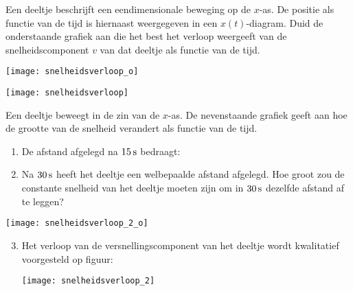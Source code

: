 \documentclass{ximera}
\begin{document}
\begin{exercise}
    Een deeltje beschrijft een eendimensionale beweging op de $x$-as. De positie als functie van de tijd is hiernaast weergegeven in een $x(t)$-diagram. Duid de onderstaande grafiek aan die het best het verloop weergeeft van de snelheidscomponent $v$ van dat deeltje als functie van de tijd. 
    \begin{image}
        \texttt{[image: snelheidsverloop\_o]}
    \end{image}
    \begin{image}
        \texttt{[image: snelheidsverloop]}
    \end{image}
\end{exercise}

\begin{exercise}
Een deeltje beweegt in de zin van de $x$-as. De nevenstaande grafiek geeft aan hoe de grootte van de snelheid verandert als functie van de tijd.
\begin{enumerate}
\item De afstand afgelegd na $15\rm\,s$ bedraagt:

\item Na $30\rm\,s$ heeft het deeltje een welbepaalde afstand afgelegd. Hoe groot zou de constante snelheid van het deeltje moeten zijn om in $30\rm\,s$ dezelfde afstand af te leggen?

\end{enumerate}
\begin{image}
    \texttt{[image: snelheidsverloop\_2\_o]}
\end{image}
\begin{enumerate}
\setcounter{enumii}{2}
\item Het verloop van de versnellingscomponent van het deeltje wordt kwalitatief voorgesteld op figuur:
\begin{image}
    \texttt{[image: snelheidsverloop\_2]}
\end{image}
\end{enumerate}
\end{exercise}
\end{document}
